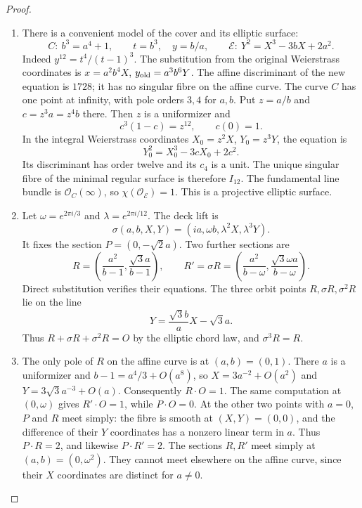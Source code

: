\begin{proof}
\begin{enumerate}[label=\arabic*.,leftmargin=*]
\item There is a convenient model of the cover
and its elliptic surface:
\[
 C:\ b^3=a^4+1,\qquad
 t=b^3,\quad y=b/a,\qquad
 \mathscr E:\ Y^2=X^3-3bX+2a^2.
\]
Indeed $y^{12}=t^4/(t-1)^3$.
The substitution from the original
Weierstrass coordinates is
$x=a^2b^4X$, $y_{\rm old}=a^3b^6Y$.
The affine discriminant of the new
equation is $1728$; it has no singular
fibre on the affine curve. The curve
$C$ has one point at infinity, with
pole orders $3,4$ for $a,b$.
Put $z=a/b$ and $c=z^3a=z^4b$ there.
Then $z$ is a uniformizer and
\[
 c^3(1-c)=z^{12},\qquad c(0)=1.
\]
In the integral Weierstrass coordinates
$X_0=z^2X$, $Y_0=z^3Y$, the equation is
\[
 Y_0^2=X_0^3-3cX_0+2c^2.
\]
Its discriminant has order twelve and
its $c_4$ is a unit. The unique singular
fibre of the minimal regular surface
is therefore $I_{12}$. The fundamental
line bundle is $\mathcal O_C(\infty)$,
so $\chi(\mathcal O_{\mathscr E})=1$.
This is a projective elliptic surface.

\item Let $\omega=e^{2\pi i/3}$ and
$\lambda=e^{2\pi i/12}$. The deck lift is
\[
 \sigma(a,b,X,Y)=(ia,\omega b,\lambda^2X,\lambda^3Y).
\]
It fixes the section $P=(0,-\sqrt2a)$.
Two further sections are
\[
 R=\left(\frac{a^2}{b-1},
                 \frac{\sqrt3a}{b-1}\right),
 \qquad
 R'=\sigma R=
   \left(\frac{a^2}{b-\omega},
                 \frac{\sqrt3\omega a}{b-\omega}\right).
\]
Direct substitution verifies their
equations. The three orbit points
$R,\sigma R,\sigma^2R$ lie on the line
\[
 Y=\frac{\sqrt3b}{a}X-\sqrt3a.
\]
Thus $R+\sigma R+\sigma^2R=O$ by the
elliptic chord law, and $\sigma^3R=R$.


\item  The only pole of $R$ on the affine
curve is at $(a,b)=(0,1)$. There $a$ is
a uniformizer and $b-1=a^4/3+O(a^8)$,
so $X=3a^{-2}+O(a^2)$ and
$Y=3\sqrt3a^{-3}+O(a)$.
Consequently $R\cdot O=1$.
The same computation at $(0,\omega)$
gives $R'\cdot O=1$, while $P\cdot O=0$.
At the other two points with $a=0$,
$P$ and $R$ meet simply: the fibre is
smooth at $(X,Y)=(0,0)$, and the
difference of their $Y$ coordinates
has a nonzero linear term in $a$.
Thus $P\cdot R=2$, and likewise
$P\cdot R'=2$. The sections $R,R'$
meet simply at $(a,b)=(0,\omega^2)$.
They cannot meet elsewhere on the
affine curve, since their $X$
coordinates are distinct for $a\ne0$.


\end{enumerate}
\end{proof}
